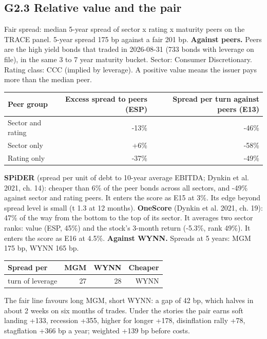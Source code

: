 \documentclass[11pt,a4paper]{article}
\begin{document}
\subsection*{G2.3 Relative value and the pair}
Fair spread: median 5-year spread of sector x rating x maturity peers on the TRACE panel. 5-year spread 175 bp against a fair 201 bp.
\textbf{Against peers.} Peers are the high yield bonds that traded in 2026-08-31 (733 bonds with leverage on file), in the same 3 to 7 year maturity bucket. Sector: Consumer Discretionary. Rating class: CCC (implied by leverage). A positive value means the issuer pays more than the median peer.
\begin{center}\footnotesize\setlength{\tabcolsep}{3.5pt}\begin{tabular}{@{}lrr@{}}\toprule
Peer group & Excess spread to peers (ESP) & Spread per turn against peers (E13) \\\midrule
Sector and rating & -13\% & -46\% \\
Sector only & +6\% & -58\% \\
Rating only & -37\% & -49\% \\
\bottomrule\end{tabular}\end{center}
\textbf{SPiDER} (spread per unit of debt to 10-year average EBITDA; Dynkin et al. 2021, ch. 14): cheaper than 6\% of the peer bonds across all sectors, and -49\% against sector and rating peers. It enters the score as E15 at 3\%. Its edge beyond spread level is small (t 1.3 at 12 months).
\textbf{OneScore} (Dynkin et al. 2021, ch. 19): 47\% of the way from the bottom to the top of its sector. It averages two sector ranks: value (ESP, 45\%) and the stock's 3-month return (-5.3\%, rank 49\%). It enters the score as E16 at 4.5\%.
\textbf{Against WYNN.} Spreads at 5 years: MGM 175 bp, WYNN 165 bp.
\begin{center}\footnotesize\setlength{\tabcolsep}{3.5pt}\begin{tabular}{@{}lrrr@{}}\toprule
Spread per & MGM & WYNN & Cheaper \\\midrule
turn of leverage & 27 & 28 & WYNN \\
\bottomrule\end{tabular}\end{center}
The fair line favours long MGM, short WYNN: a gap of 42 bp, which halves in about 2 weeks on six months of trades. Under the stories the pair earns soft landing +133, recession +355, higher for longer +178, disinflation rally +78, stagflation +366 bp a year; weighted +139 bp before costs.
\end{document}

